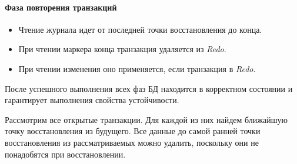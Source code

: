 \paragraph{Фаза повторения транзакций}

\begin{itemize}
	\item Чтение журнала идет от последней точки восстановления до конца.
	\item При чтении маркера конца транзакция удаляется из \textit{Redo}.
	\item При чтении изменения оно применяется, если транзакция в \textit{Redo}.
\end{itemize}

\begin{proposition}
	После успешного выполнения всех фаз БД находится в корректном состоянии и гарантирует выполнения
	свойства устойчивости.
\end{proposition}

\begin{proposition}
	Рассмотрим все открытые транзакции. Для каждой из них найдем ближайшую точку восстановления из
	будущего. Все данные до самой ранней точки восстановления из рассматриваемых можно удалить,
	поскольку они не понадобятся при восстановлении.
\end{proposition}

